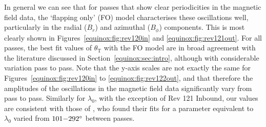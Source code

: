 In general we can see that for passes that show clear periodicities in the magnetic field data, the `flapping only' (FO) model characterises these oscillations well, particularly in the radial ($B_{r}$) and azimuthal ($B_\phi$) components. This is most clearly shown in Figures~\ref{equinox:fig:rev120in} and \ref{equinox:fig:rev121out}. For all passes, the best fit values of $\theta_\mathrm{T}$ with the FO model are in broad agreement with the literature discussed in Section~\ref{equinox:sec:intro}, although with considerable variation pass to pass. Note that the y-axis scales are not exactly the same for Figures~\ref{equinox:fig:rev120in} to \ref{equinox:fig:rev122out}, and that therefore the amplitudes of the oscillations in the magnetic field data significantly vary from pass to pass. Similarly for $\lambda_0$, with the exception of Rev 121 Inbound, our values are consistent with those of \citet{arridge2011}, who found their fits for a parameter equivalent to $\lambda_0$ varied from $101{\--}\SI{292}{\degree}$ between passes.


